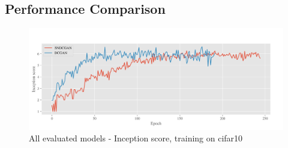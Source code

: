 %
%










\subsection{Performance Comparison}

\begin{figure}[h]
\centering
\includegraphics[width=\textwidth]{../code/results/figures/all_cifar10_is.png}
\caption{All evaluated models - Inception score, training on cifar10}
\label{fig:exp-all-is}
\end{figure}


